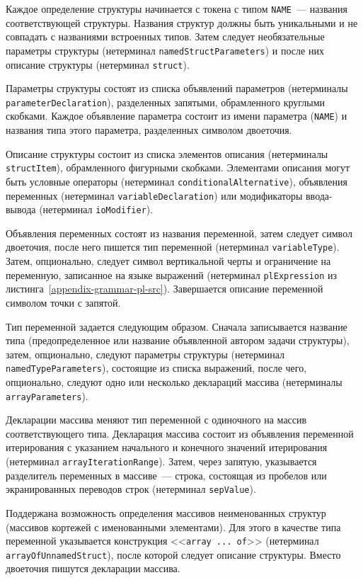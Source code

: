 \documentclass[times,specification,annotation]{style/itmo-student-thesis/itmo-student-thesis}
\begin{document}
Каждое определение структуры начинается с токена с типом \texttt{NAME}~--- названия соответствующей структуры. Названия структур должны быть уникальными и не совпадать с названиями встроенных типов. Затем следует необязательные параметры структуры (нетерминал \texttt{namedStructParameters}) и после них описание структуры (нетерминал \texttt{struct}).

Параметры структуры состоят из списка объявлений параметров (нетерминалы \texttt{parameterDeclaration}), разделенных запятыми, обрамленного круглыми скобками. Каждое объявление параметра состоит из имени параметра (\texttt{NAME}) и названия типа этого параметра, разделенных символом двоеточия.

Описание структуры состоит из списка элементов описания (нетерминалы \texttt{structItem}), обрамленного фигурными скобками. Элементами описания могут быть условные операторы (нетерминал \texttt{conditionalAlternative}), объявления переменных (нетерминал \texttt{variableDeclaration}) или модификаторы ввода-вывода (нетерминал \texttt{ioModifier}).

Объявления переменных состоят из названия переменной, затем следует символ двоеточия, после него пишется тип переменной (нетерминал \texttt{variableType}). Затем, опционально, следует символ вертикальной черты и ограничение на переменную, записанное на языке выражений (нетерминал \texttt{plExpression} из листинга~\ref{appendix-grammar-pl-src}). Завершается описание переменной символом точки с запятой.

Тип переменной задается следующим образом. Сначала записывается название типа (предопределенное или название объявленной автором задачи структуры), затем, опционально, следуют параметры структуры (нетерминал \texttt{namedTypeParameters}), состоящие из списка выражений, после чего, опционально, следуют одно или несколько деклараций массива (нетерминалы \texttt{arrayParameters}).

Декларации массива меняют тип переменной с одиночного на массив соответствующего типа. Декларация массива состоит из объявления переменной итерирования с указанием начального и конечного значений итерирования (нетерминал \texttt{arrayIterationRange}). Затем, через запятую, указывается разделитель переменных в массиве~--- строка, состоящая из пробелов или экранированных переводов строк (нетерминал \texttt{sepValue}).

Поддержана возможность определения массивов неименованных структур (массивов кортежей с именованными элементами). Для этого в качестве типа переменной указывается конструкция <<\texttt{array ... of}>> (нетерминал \texttt{arrayOfUnnamedStruct}), после которой следует описание структуры. Вместо двоеточия пишутся декларации массива.
\end{document}
